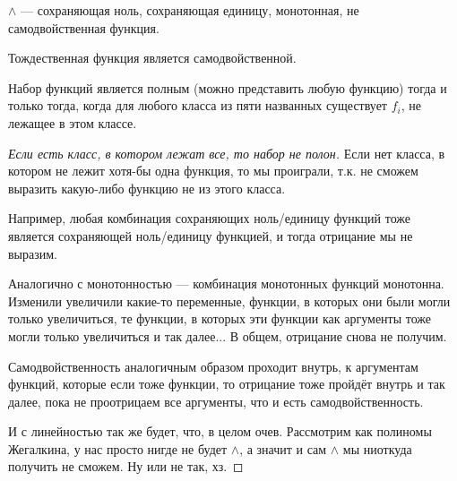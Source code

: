 \begin{example}
	$\land$ --- сохраняющая ноль, сохраняющая единицу, монотонная, не самодвойственная функция. 
	
	Тождественная функция является самодвойственной. 
\end{example}

\begin{theorem}
	Набор функций является полным (можно представить любую функцию) тогда и только тогда, когда для любого класса из пяти названных существует $f_i$, не лежащее в этом классе.
\end{theorem}
\begin{proof}[Если есть класс, в котором лежат все, то набор не полон]
	Если нет класса, в котором не лежит хотя-бы одна функция, то мы проиграли, т.к. не сможем выразить какую-либо функцию не из этого класса. 

	Например, любая комбинация сохраняющих ноль/единицу функций тоже является сохраняющей ноль/единицу функцией, и тогда отрицание мы не выразим.

	Аналогично с монотонностью --- комбинация монотонных функций монотонна. Изменили увеличили какие-то переменные, функции, в которых они были могли только увеличиться, те функции, в которых эти функции как аргументы тоже могли только увеличиться и так далее... В общем, отрицание снова не получим. 

	Самодвойственность аналогичным образом проходит внутрь, к аргументам функций, которые если тоже функции, то отрицание тоже пройдёт внутрь и так далее, пока не проотрицаем все аргументы, что и есть самодвойственность. 

	И с линейностью так же будет, что, в целом очев. Рассмотрим как полиномы Жегалкина, у нас просто нигде не будет $\land$, а значит и сам $\land$ мы ниоткуда получить не сможем. Ну или не так, хз.
\end{proof}

